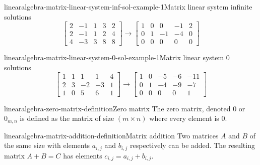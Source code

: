 \documentclass[preview]{standalone}
\begin{document}
\begin{snippetexample}{linearalgebra-matrix-linear-system-inf-sol-example-1}{Matrix linear system infinite solutions}
    \[
        \begin{bmatrix}
            2 & -1 & 1 & 3 & 2 \\
            2 & -1 & 1 & 2 & 4 \\
            4 & -3 & 3 & 8 & 8
        \end{bmatrix}
        \rightarrow
        \begin{bmatrix}
            1 & 0 & 0 & -1 & 2 \\
            0 & 1 & -1 & -4 & 0 \\
            0 & 0 & 0 & 0 & 0
        \end{bmatrix}
    \]
\end{snippetexample}

\begin{snippetexample}{linearalgebra-matrix-linear-system-0-sol-example-1}{Matrix linear system 0 solutions}
    \[
        \begin{bmatrix}
            1 & 1 & 1 & 1 & 4 \\
            2 & 3 & -2 & -3 & 1 \\
            1 & 0 & 5 & 6 & 1
        \end{bmatrix}
        \rightarrow
        \begin{bmatrix}
            1 & 0 & -5 & -6 & -11 \\
            0 & 1 & -4 & -9 & -7 \\
            0 & 0 & 0 & 0 & 1
        \end{bmatrix}
    \]
\end{snippetexample}

\begin{snippetdefinition}{linearalgebra-zero-matrix-definition}{Zero matrix}
    The zero matrix, denoted \(0\) or \(0_{m,n}\)
    is defined as the matrix of size \((m \times n)\)
    where every element is \(0\).
\end{snippetdefinition}

\begin{snippetdefinition}{linearalgebra-matrix-addition-definition}{Matrix addition}
    Two matrices \(A\) and \(B\) of the same size
    with elements \(a_{i,j}\) and \(b_{i,j}\) respectively
    can be added. The resulting matrix \(A+B=C\)
    has elements \(c_{i,j} = a_{i,j} + b_{i,j}\).
\end{snippetdefinition}
\end{document}
